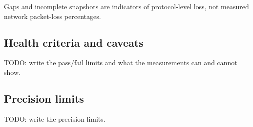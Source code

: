 \IfFileExists{IEEEtran.cls}{\ieeetrue\documentclass[conference]{IEEEtran}}{\ieeefalse\documentclass[twocolumn,10pt]{article}}
\begin{document}
Gaps and incomplete snapshots are indicators of protocol-level loss, not
measured network packet-loss percentages.


\subsection{Health criteria and caveats}
TODO: write the pass/fail limits and what the measurements can and cannot show.

\subsection{Precision limits}
\label{sec:precision}
TODO: write the precision limits.
\end{document}
